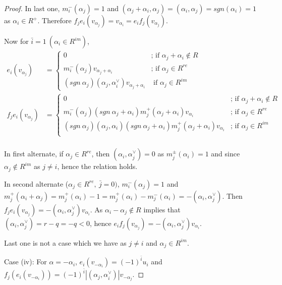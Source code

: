 \documentclass[11pt]{amsart}
\theoremstyle{plain}
\theoremstyle{definition}
\numberwithin{equation}{section}
\newcommand{\al}{\alpha}
\begin{document}
\begin{proof}
		In last one, $m_i^-(\al_j)=1$ and $(\al_j+\al_i,\al_j)=(\al_i,\al_j)=sgn(\al_i)=1$ as $\al_i\in R^+$. Therefore $f_je_i(v_{\al_j})=v_{\al_i}=e_if_j(v_{\al_j})$.
		
		Now for $\bar{i}=1~(\al_i\in R^{im})$,
		\begin{align*}
			e_i(v_{\alpha_j})&=\begin{cases}
				0&\text{; if }\al_j+\al_i\notin R\\
				m_i^-(\alpha_j)v_{\al_j+\alpha_i}& \text{; if }\al_j\in R^{re}\\
				(sgn~\al_j)(\al_j,\al_i^{\vee})v_{\al_j+\al_i}&\text{ if }\al_j\in R^{im}
			\end{cases}\\
			f_je_i(v_{\alpha_j})&=\begin{cases}
				0&\text{; if }\al_j+\al_i\notin R\\
				m_i^-(\alpha_j)(sgn~\al_j+\al_i)m_j^+(\al_j+\al_i)v_{\alpha_i}& \text{; if }\al_j\in R^{re}\\
				(sgn~\al_j)(\al_j,\al_i)(sgn~\al_j+\al_i)m_j^+(\al_j+\al_i)v_{\al_i}&\text{; if }\al_j\in R^{im}\\
			\end{cases}\\
		\end{align*}
		
		In first alternate, if $\al_j\in R^{re}$, then $(\al_i,\al_j^{\vee})=0$ as $m_j^{\pm}(\al_i)=1$ and since $\al_j\notin R^{im}$ as $j\neq i$, hence the relation holds.
		
		In second alternate ($\al_j\in R^{re},~\bar j=0)$, $m_i^-(\al_j)=1$ and $m_j^+(\al_i+\al_j)=m_j^+(\al_i)-1=m_j^+(\al_i)-m_j^-(\al_i)=-(\al_i,\al_j^{\vee})$. Then $f_je_i(v_{\al_j})=-(\al_i,\al_j^{\vee})v_{\al_i}$. As $\al_i-\al_j\notin R$ implies that $(\al_i,\al_j^{\vee})=r-q=-q<0$, hence $e_if_j(v_{\al_j})=-(\al_i,\al_j^{\vee})v_{\al_i}$.
		
		Last one is not a case which we have as $j\neq i$ and $\al_j\in R^{im}$.
		
		Case (iv): For $\alpha=-\alpha_i$, $e_i(v_{-\alpha_i})=(-1)^{\bar i}u_i$ and $f_j(e_i(v_{-\alpha_i}))=(-1)^{\bar i}|( \alpha_j,\alpha_i^{\vee})|v_{-\alpha_j}$. 
		

\end{proof}
\end{document}
